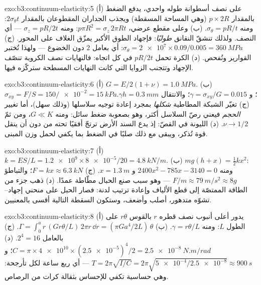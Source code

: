 \begin{solution}{exo:b3:continuum-elasticity:5}
(أ) على نصف أسطوانة طوله واحدي، يدفع الضغط بالمقدار $p
\times 2R$ (وهي المساحة المسقطة) ويجذب الجداران المقطوعان بالمقدار
$2\sigma_\theta t$: ومنه $\sigma_\theta = pR/t$. (ب) وعلى مقطع عرضي،
$p\pi R^2 = \sigma_z\,2\pi Rt$: ومنه $\sigma_z = pR/2t$ --- أي النصف.
ولذلك تنشقّ النقانق \emph{طوليًا}: فإجهاد الطوق الأكبر يمزّق
الغلاف على المحور. (ج) $\sigma_\theta = \num{2e7} \times
0.09/0.005 = \qty{360}{MPa}$: أي بعامل $2$ دون الخضوع --- ولهذا
تُختبر القوارير وتُفحص. (د) الكرة تحمل
$pR/2t$ في كل اتجاه: فالنهايات نصف الكروية تنصّف الإجهاد
وتتجنب الزوايا التي كانت النهايات المسطحة ستركّزه فيها.
\end{solution}

\begin{solution}{exo:b3:continuum-elasticity:6}
(أ) $G = E/2(1 + \nu) = \qty{1.0}{MPa}$. (ب) $\sigma_{xy} = F/S =
150/\num{e-2} = \qty{15}{kPa}$؛ و $\gamma = \sigma_{xy}/G = 0.015$؛
والانتقال $\gamma h = \qty{0.3}{mm}$. (ج) تغيّر الشبكة المطاطية
\emph{شكلها} بمجرد إعادة توجيه سلاسلها (وذلك سهل)، أما تغيير
\emph{الحجم} فيعني رصّ السلاسل أكثر، وهو بصعوبة ضغط
سائل: ومنه $G \ll K$، ومن ثمّ $\nu \to 1/2$. (د) الليونة في القصّ:
إذ يدع السند الأرض ترتجّ أفقيًا تحته من دون أن ينقل
قوة تُذكر، ويبقى مع ذلك صلبًا في الضغط بما يكفي لحمل وزن
المبنى.
\end{solution}

\begin{solution}{exo:b3:continuum-elasticity:7}
(أ) $k = ES/L = \num{1.2e9} \times \num{8e-5}/20 = \qty{4.8}{kN/m}$.
(ب) $mg(h + x) = \tfrac12 kx^2$: ومنه $2400x^2 - 785x - 3140 = 0$ و $x =
\qty{1.3}{m}$. (ج) $F = kx \approx \qty{6.3}{kN}$؛ والتباطؤ $F/m
\approx \qty{79}{m/s^2} \approx 8g$ --- وهو سبب صنع الحبال
مطّاطة عمدًا. (د) ذهب جزء من الطاقة الممتصّة إلى قطع
الألياف وإعادة ترتيب لدنة: فصار الحبل على منحني
إجهاد--تشوّه متدهور، أصلب وأضعف، وستكون السقطة التالية أقسى
بالمعنيين.
\end{solution}

\begin{solution}{exo:b3:continuum-elasticity:8}
(أ) يدور أعلى أنبوب نصف قطره $r$ بالقوس $r\theta$ على
الطول $L$: ومنه $\gamma = r\theta/L$. (ب) $\Gamma = \int_0^a r\,(G r\theta/L)\,
2\pi r\,\dd r = (\pi Ga^4/2L)\,\theta$. (ج) بالعامل $2^4 = 16$. (د) $C =
\pi \times \num{4e10} \times (\num{2.5e-5})^4/2 =
\qty{2.5e-8}{N.m/rad}$؛ و $T = 2\pi\sqrt{I/C} = 2\pi\sqrt{\num{5e-4}/
\num{2.5e-8}} \approx \qty{900}{s}$ --- أي ربع ساعة لكل
تأرجحة: وهي حساسية تكفي للإحساس بثقالة كرات من الرصاص.
\end{solution}

